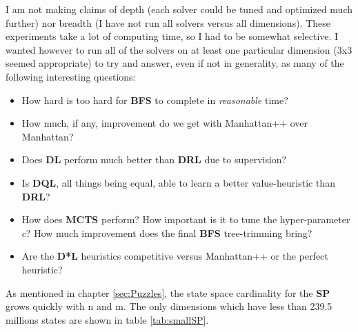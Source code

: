 \noindent I am not making claims of depth (each solver could be tuned and optimized much further) nor breadth (I have not run all solvers versus all dimensions). These experiments take a lot of computing time, so I had to be somewhat selective. I wanted however to run all of the solvers on at least one particular dimension (3x3 seemed appropriate) to try and answer, even if not in generality, as many of the following interesting questions:
\begin{itemize}
\item How hard is too hard for \textbf{BFS} to complete in \textit{reasonable} time?
\item How much, if any, improvement do we get with Manhattan++ over Manhattan?
\item Does \textbf{DL} perform much better than \textbf{DRL} due to supervision?
\item Is \textbf{DQL}, all things being equal, able to learn a better value-heuristic than \textbf{DRL}?
\item How does \textbf{MCTS} perform? How important is it to tune the hyper-parameter $c$? How much improvement does the final \textbf{BFS} tree-trimming bring?
\item Are the \textbf{D*L} heuristics competitive versus Manhattan++ or the perfect heuristic?
\end{itemize}












\label{sec:SPLowDimension}


As mentioned in chapter \ref{sec:Puzzles}, the state space cardinality for the \textbf{SP} grows quickly with n and m. The only dimensions which have less than 239.5 millions states are shown in table \ref{tab:smallSP}.


